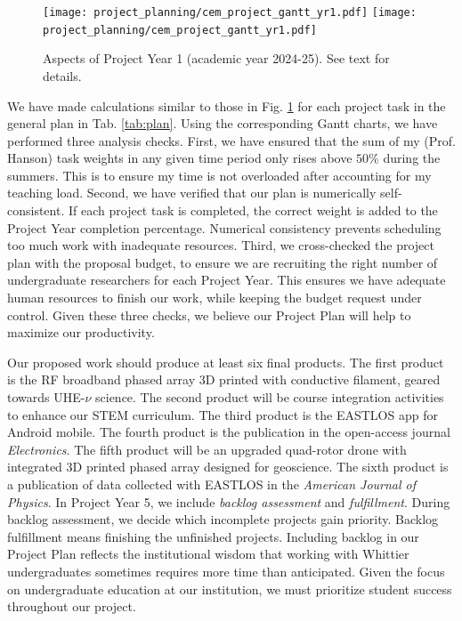 \documentclass[../../main.tex]{subfiles}
\begin{document}
\begin{figure}
\centering
\texttt{[image: project\_planning/cem\_project\_gantt\_yr1.pdf]}
\texttt{[image: project\_planning/cem\_project\_gantt\_yr1.pdf]}
\caption{\label{fig:gantt_1} Aspects of Project Year 1 (academic year 2024-25).  See text for details.}
\end{figure}

We have made calculations similar to those in Fig. \ref{fig:gantt_1} for each project task in the general plan in Tab. \ref{tab:plan}.  Using the corresponding Gantt charts, we have performed three analysis checks.  First, we have ensured that the sum of my (Prof. Hanson) task weights in any given time period only rises above $50\%$ during the summers.  This is to ensure my time is not overloaded after accounting for my teaching load.  Second, we have verified that our plan is numerically self-consistent.  If each project task is completed, the correct weight is added to the Project Year completion percentage.  Numerical consistency prevents scheduling too much work with inadequate resources.  Third, we cross-checked the project plan with the proposal budget, to ensure we are recruiting the right number of undergraduate researchers for each Project Year.  This ensures we have adequate human resources to finish our work, while keeping the budget request under control.  Given these three checks, we believe our Project Plan will help to maximize our productivity. \\ \vspace{2.5mm}

Our proposed work should produce at least six final products.  The first product is the RF broadband phased array 3D printed with conductive filament, geared towards UHE-$\nu$ science.  The second product will be course integration activities to enhance our STEM curriculum.  The third product is the EASTLOS app for Android mobile.  The fourth product is the publication in the open-access journal \textit{Electronics}.  The fifth product will be an upgraded quad-rotor drone with integrated 3D printed phased array designed for geoscience.  The sixth product is a publication of data collected with EASTLOS in the \textit{American Journal of Physics}.  In Project Year 5, we include \textit{backlog assessment} and \textit{fulfillment}.  During backlog assessment, we decide which incomplete projects gain priority.  Backlog fulfillment means finishing the unfinished projects.  Including backlog in our Project Plan reflects the institutional wisdom that working with Whittier undergraduates sometimes requires more time than anticipated.  Given the focus on undergraduate education at our institution, we must prioritize student success throughout our project.
\end{document}
